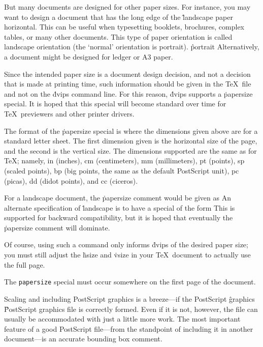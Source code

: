 But many documents are designed for other paper sizes.  For instance,
you may want to design a document that has the long edge of the
\^{landscape}
paper horizontal.  This can be useful when typesetting booklets,
brochures, complex tables, or many other documents.  This type of
paper orientation is called landscape orientation (the `normal'
orientation is portrait).
\^{portrait}
Alternatively, a document might be designed for ledger or A3 paper.

Since the intended paper size is a document design decision, and
not a decision that is made at printing time, such information
should be given in the \TeX\ file and not on the \.{dvips}
command line.  For this reason, \.{dvips} supports a \.{papersize}
special.  It is hoped that this special will become standard over
time for \TeX\ previewers and other printer drivers.

The format of the \.{papersize} special is
\noindent
where the dimensions given above are for a standard letter sheet.
The first dimension given is the horizontal size of the page, and
the second is the vertical size.  The dimensions supported are
the same as for \TeX; namely, in (inches), cm (centimeters), mm
(millimeters), pt (points), sp (scaled points), bp (big points, the
same as the default PostScript unit), pc (picas), dd (didot points),
and cc (ciceros).

For a landscape document, the \.{papersize} comment would be given as
\noindent
An alternate specification of \.{landscape} is to have a special
of the form
\noindent
This is supported for backward compatibility, but it is hoped that
eventually the \.{papersize} comment will dominate.

Of course, using such a command only informs \.{dvips} of the desired
paper size; you must still adjust the \.{hsize} and \.{vsize} in your
\TeX\ document to actually use the full page.

The {\tt papersize} special must occur somewhere on the first page of the
document.


Scaling and including PostScript graphics is a breeze---if the PostScript
\^{graphics}
\^{PostScript graphics}
file is correctly formed.  Even if it is not, however, the file can usually
be accommodated with just a little more work.  The most important feature of
a good PostScript file---from the standpoint of including it in another
document---is an accurate bounding box comment.


